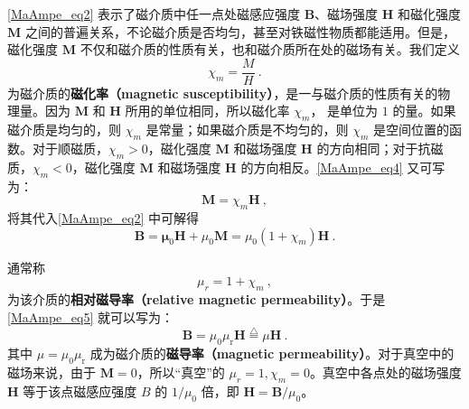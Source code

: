 \autoref{MaAmpe_eq2} 表示了磁介质中任一点处磁感应强度 $\mathbf B$、磁场强度 $\mathbf H$ 和磁化强度 $\mathbf M $ 之间的普遍关系，不论磁介质是否均匀，甚至对铁磁性物质都能适用。但是，磁化强度 $\mathbf M $ 不仅和磁介质的性质有关，也和磁介质所在处的磁场有关。我们定义
\begin{equation} \label{MaAmpe_eq4}
\chi_{m}=\frac{M}{H}~.
\end{equation}
为磁介质的\textbf{磁化率（magnetic susceptibility）}，是一与磁介质的性质有关的物理量。因为 $\mathbf M $ 和 $\mathbf H $ 所用的单位相同，所以磁化率 $\chi_m$， 是单位为 $1 $ 的量。如果磁介质是均匀的，则 $\chi_m$ 是常量；如果磁介质是不均匀的，则 $\chi_m$ 是空间位置的函数。对于顺磁质，$\chi_m>0$，磁化强度 $\mathbf M $ 和磁场强度 $\mathbf H $ 的方向相同；对于抗磁质，$\chi_m<0$，磁化强度 $\mathbf M $ 和磁场强度 $\mathbf H $ 的方向相反。\autoref{MaAmpe_eq4} 又可写为：
\begin{equation} \label{MaAmpe_eq5}
\mathbf M = \chi_m\mathbf H~,
\end{equation}
将其代入\autoref{MaAmpe_eq2} 中可解得
\begin{equation}
\mathbf{B}=\mathbf{\mu}_{0} \mathbf{H}+\mu_{0} \mathbf{M}=\mu_{0}\left(1+\chi_{{m}}\right) \mathbf{H}~.
\end{equation}

通常称
\begin{equation}
\mu_{{r}}=1+\chi_{m}~,
\end{equation}
为该介质的\textbf{相对磁导率（relative magnetic permeability）}。于是\autoref{MaAmpe_eq5} 就可以写为：
\begin{equation}
\mathbf B=\mu_{0} \mu_{\mathrm{r}} \mathbf H\overset{\triangle}=\mu \mathbf H~.
\end{equation}
其中 $\mu = \mu_{0} \mu_{\mathrm{r}} $ 成为磁介质的\textbf{磁导率（magnetic permeability）}。对于真空中的磁场来说，由于 $\mathbf M=0$，所以“真空”的 $\mu_r=1,\chi_m=0$。真空中各点处的磁场强度 $\mathbf H $ 等于该点磁感应强度 $B $ 的 $1/\mu_0$ 倍，即 $\mathbf H = \mathbf B / \mu_0$。